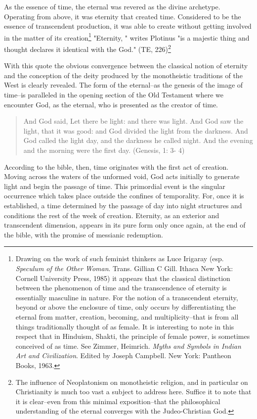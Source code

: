 As the essence of time, the eternal was revered as the divine
archetype. Operating from above, it was eternity that created time.
Considered to be the essence of transcendent production, it was able to
create without getting involved in the matter of its creation\footnote{Drawing on the work of such feminist thinkers as Luce Irigaray (esp. \textit{Speculum of the Other Woman}. Trans. Gillian C Gill. Ithaca New York: Cornell University Press, 1985) it appears that the classical distinction between the phenomenon of time and the transcendence of eternity is essentially masculine in nature. For the notion of a transcendent eternity, beyond or above the enclosure of time, only occurs by differentiating the eternal from matter, creation, becoming, and multiplicity--that is from all things traditionally thought of as female. It is interesting to note in this respect that in Hinduism, Shakti, the principle of female power, is sometimes conceived of as time. See Zimmer, Heimrich. \textit{Myths and Symbols in Indian Art and Civilization}. Edited by Joseph Campbell. New York: Pantheon Books, 1963.} "Eternity, " writes Plotinus "is a majestic thing and thought declares it identical with the God." (TE, 226)\footnote{The influence of Neoplatonism on monotheistic religion, and in particular on Christianity is much too vast a subject to address here. Suffice it to note that it is clear--even from this minimal exposition--that the philosophical understanding of the eternal converges with the Judeo-Christian God.}

With this quote the obvious convergence between the classical notion
of eternity and the conception of the deity produced by the monotheistic
traditions of the West is clearly revealed. The form of the eternal--as the
genesis of the image of time--is paralleled in the opening section of the Old Testament where we encounter God, as the eternal, who is presented as the creator of time. 

\begin{quote}
    And God said, Let there be light: and there was light. And God saw the light, that it was good: and God divided the light from the darkness. And God called the light day, and the darkness he called night. And the evening and the morning were the first day. (Genesis, 1: 3- 4) 
\end{quote}

According to the bible, then, time originates with the first act of creation. Moving across the waters of the unformed void, God acts initially to generate light and begin the passage of time. This primordial event is the singular occurrence which takes place outside the confines of temporality. For, once it is established, a time determined by the passage of day into night structures and conditions the rest of the week of creation. Eternity, as an exterior and transcendent dimension, appears in its pure form only once again, at the end of the bible, with the promise of messianic redemption.


